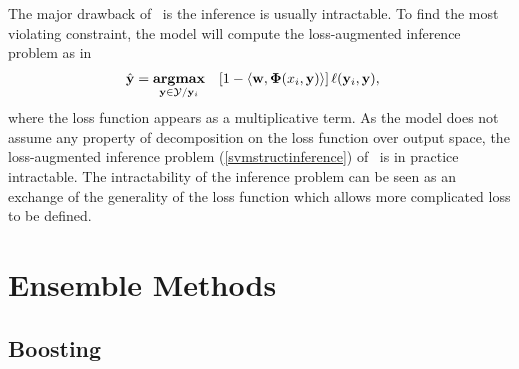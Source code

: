 The major drawback of \svmstruct\ is the inference is usually intractable.
To find the most violating constraint, the model will compute the loss-augmented inference problem as in \citep{TJTA05}
\begin{align}
	\hat{\mathbf {y}} = \underset{\mathbf {y}\in\mathcal{Y}/\mathbf {y}_i}{\textbf{argmax}} &\quad [1-\langle \mathbf {w}, \mathbf{\Phi}(x_i,\mathbf {y}) \rangle]\,\mathbf {\ell}(\mathbf {y}_i,\mathbf {y}) \label{svmstructinference},
\end{align}
where the loss function appears as a multiplicative term.
As the model does not assume any property of decomposition on the loss function over output space, the loss-augmented inference problem (\ref{svmstructinference}) of \svmstruct\ is in practice intractable. 
The intractability of the inference problem can be seen as an exchange of the generality of the loss function which allows more complicated loss to be defined. 




\section{Ensemble Methods}

\subsection{Boosting}
